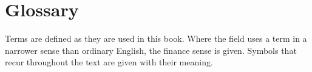 
\backmatter

\chapter*{Glossary}
\thispagestyle{plain}

\noindent\small
Terms are defined as they are used in this book. Where the field uses a term
in a narrower sense than ordinary English, the finance sense is given.
Symbols that recur throughout the text are given with their meaning.

